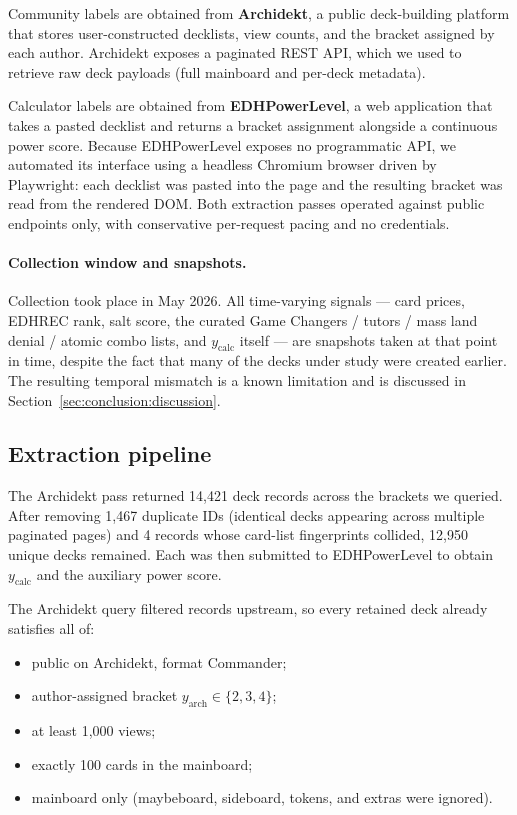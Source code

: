 \documentclass{article}
\begin{document}
Community labels are obtained from \textbf{Archidekt}, a public deck-building platform that stores user-constructed decklists, view counts, and the bracket assigned by each author. Archidekt exposes a paginated REST API, which we used to retrieve raw deck payloads (full mainboard and per-deck metadata).

Calculator labels are obtained from \textbf{EDHPowerLevel}, a web application that takes a pasted decklist and returns a bracket assignment alongside a continuous power score. Because EDHPowerLevel exposes no programmatic API, we automated its interface using a headless Chromium browser driven by Playwright: each decklist was pasted into the page and the resulting bracket was read from the rendered DOM. Both extraction passes operated against public endpoints only, with conservative per-request pacing and no credentials.

\paragraph{Collection window and snapshots.} Collection took place in May 2026. All time-varying signals --- card prices, EDHREC rank, salt score, the curated Game Changers / tutors / mass land denial / atomic combo lists, and \(y_{\text{calc}}\) itself --- are snapshots taken at that point in time, despite the fact that many of the decks under study were created earlier. The resulting temporal mismatch is a known limitation and is discussed in Section~\ref{sec:conclusion:discussion}.

\subsection{Extraction pipeline}
\label{sec:data:extraction}

The Archidekt pass returned 14{,}421 deck records across the brackets we queried. After removing 1{,}467 duplicate IDs (identical decks appearing across multiple paginated pages) and 4 records whose card-list fingerprints collided, 12{,}950 unique decks remained. Each was then submitted to EDHPowerLevel to obtain \(y_{\text{calc}}\) and the auxiliary power score.

The Archidekt query filtered records upstream, so every retained deck already satisfies all of:
\begin{itemize}
  \item public on Archidekt, format Commander;
  \item author-assigned bracket \(y_{\text{arch}} \in \{2,3,4\}\);
  \item at least 1{,}000 views;
  \item exactly 100 cards in the mainboard;
  \item mainboard only (maybeboard, sideboard, tokens, and extras were ignored).
\end{itemize}
\end{document}
